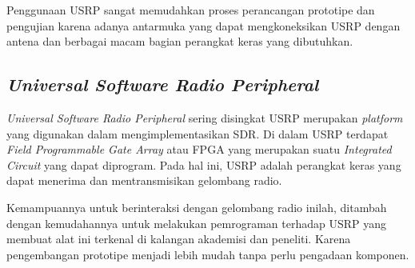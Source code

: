 Penggunaan USRP sangat memudahkan proses perancangan prototipe dan pengujian karena adanya antarmuka yang dapat mengkoneksikan USRP dengan antena dan berbagai macam bagian perangkat keras yang dibutuhkan.

\subsection{\textit{Universal Software Radio Peripheral}}

\textit{Universal Software Radio Peripheral} sering disingkat USRP merupakan \textit{platform} yang digunakan dalam mengimplementasikan SDR. Di dalam USRP terdapat \textit{Field Programmable Gate Array} atau FPGA yang merupakan suatu \textit{Integrated Circuit} yang dapat diprogram. Pada hal ini, USRP adalah perangkat keras yang dapat menerima dan mentransmisikan gelombang radio.

Kemampuannya untuk berinteraksi dengan gelombang radio inilah, ditambah dengan kemudahannya untuk melakukan pemrograman terhadap USRP yang membuat alat ini terkenal di kalangan akademisi dan peneliti. Karena pengembangan prototipe menjadi lebih mudah tanpa perlu pengadaan komponen.

